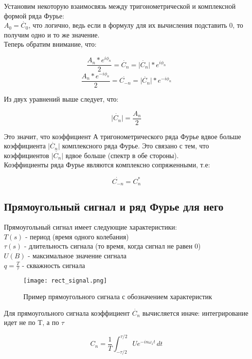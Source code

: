 Установим некоторую взаимосвязь между тригонометрической и комплексной формой ряда Фурье: \\

$A_0 = \dot{C_0}$, что логично, ведь если в формулу для их вычисления подставить 0, то получим одно и то же значение. \\

Теперь обратим внимание, что:

$$\frac{A_n*e^{i\phi_n}}{2} = \dot{C_n} = \lvert\dot{C_n}\rvert * e^{i\phi_n}$$
$$\frac{A_n*e^{-i\phi_n}}{2} = \dot{C_{-n}} = \lvert\dot{C_n}\rvert * e^{-i\phi_n}$$

Из двух уравнений выше следует, что:

$$\lvert\dot{C_n}\rvert = \frac{A_n}{2}$$

Это значит, что коэффициент А тригонометрического ряда Фурье вдвое больше коэффициента $\lvert\dot{C_n}\rvert$ комплексного ряда
Фурье. Это связано с тем, что коэффициентов $\lvert\dot{C_n}\rvert$ вдвое больше (спектр в обе стороны). \\

Коэффициенты ряда Фурье являются комплексно сопряженными, т.е:

$$\dot{C_{-n}} = C_{n}^*$$


\subsection*{\textbf{Прямоугольный сигнал и ряд Фурье для него}}

Прямоугольный сигнал имеет следующие характеристики: \\

$T(s)$ - период (время одного колебания) \\
$\tau(s)$ - длительность сигнала (то время, когда сигнал не равен 0) \\
$U (B)$ - максимальное значение сигнала \\
$q = \frac{T}{\tau}$ - скважность сигнала \\

\begin{figure}[H]
    \centering
    \texttt{[image: rect\_signal.png]}
    \caption{Пример прямоугольного сигнала с обозначением характеристик}
\end{figure}

Для прямоугольного сигнала коэффициент $\dot{C_n}$ вычисляется иначе: интегрирование идет не по T, а по $\tau$

\[
C_n = \frac{1}{T} \int_{-\tau/2}^{\tau/2} U e^{-i n \omega_1 t}\, dt
\]

